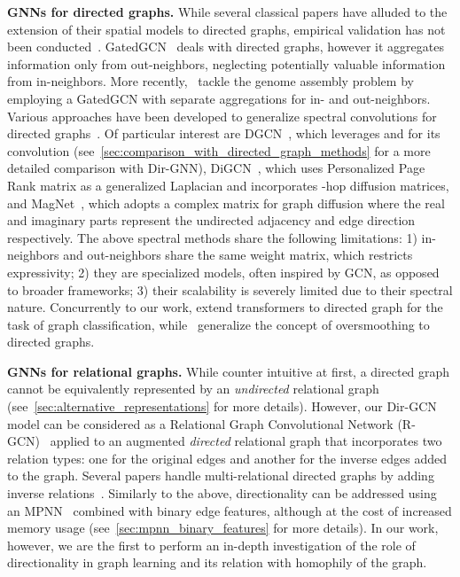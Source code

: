 \documentclass{article}
\theoremstyle{plain}
\theoremstyle{definition}
\theoremstyle{remark}
\begin{document}
\textbf{GNNs for directed graphs.}
While several classical papers have alluded to the extension of their spatial models to directed graphs, empirical validation has not been conducted~\cite{Scarselli:2009ku,li2015gated,gilmer2017neural}. GatedGCN~\cite{DBLP:journals/corr/LiTBZ15} deals with directed graphs, however it aggregates information only from out-neighbors, neglecting potentially valuable information from in-neighbors. More recently,~\citet{vrvcek2022learning} tackle the genome assembly problem by employing a GatedGCN with separate aggregations for in- and out-neighbors.
Various approaches have been developed to generalize spectral convolutions for directed graphs~\cite{spectral-dgcn,motifnet}. Of particular interest are DGCN~\cite{dgcn}, which leverages  and  for its convolution (see~\cref{sec:comparison_with_directed_graph_methods} for a more detailed comparison with Dir-GNN), DiGCN~\cite{digraph}, which uses Personalized Page Rank matrix as a generalized Laplacian and incorporates -hop diffusion matrices, and MagNet~\cite{zhang2021magnet}, which adopts a complex matrix for graph diffusion where the real and imaginary parts represent the undirected adjacency and edge direction respectively. 
The above spectral methods share the following limitations: 1) in-neighbors and out-neighbors share the same weight matrix, which restricts expressivity; 2) they are specialized models, often inspired by GCN, as opposed to broader frameworks; 3) their scalability is severely limited due to their spectral nature. Concurrently to our work, \citet{pmlr-v202-geisler23a} extend transformers to directed graph for the task of graph classification, while~\citet{maskey2023fractional} generalize the concept of oversmoothing to directed graphs. 

\textbf{GNNs for relational graphs.} While counter intuitive at first, a directed graph cannot be equivalently represented by an \textit{undirected} relational graph (see~\cref{sec:alternative_representations} for more details). However, our Dir-GCN model can be considered as a Relational Graph Convolutional Network (R-GCN)~\cite{10.1007/978-3-319-93417-4_38} applied to an augmented \textit{directed} relational graph that incorporates two relation types: one for the original edges and another for the inverse edges added to the graph. Several papers handle multi-relational directed graphs by adding inverse relations~\cite{10.1007/978-3-319-93417-4_38,marcheggiani-titov-2017-encoding,DBLP:journals/corr/abs-1904-08745,Vashishth2020Composition-based}. 
Similarly to the above, directionality can be addressed using an MPNN~\cite{gilmer2017neural} combined with binary edge features, although at the cost of increased memory usage (see~\cref{sec:mpnn_binary_features} for more details).
In our work, however, we are the first to perform an in-depth investigation of the role of directionality in graph learning and its relation with homophily of the graph.
\end{document}
